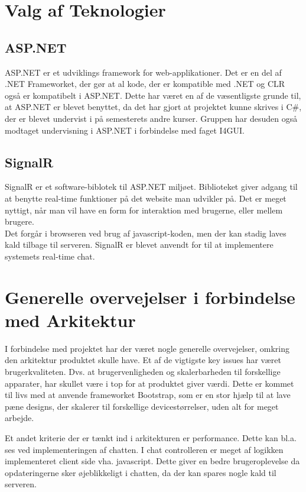 \section{Valg af Teknologier}
\subsection{ASP.NET}
ASP.NET er et udviklings framework for web-applikationer.
Det er en del af .NET Frameworket, der gør at al kode, der er  kompatible med .NET og CLR også er kompatibelt i ASP.NET. Dette har været en af de væsentligste grunde til, at ASP.NET er blevet benyttet, da det har gjort at projektet kunne skrives i C\#, der er blevet undervist i på semesterets andre kurser. Gruppen har desuden også modtaget undervisning i ASP.NET i forbindelse med faget I4GUI.

\subsection{SignalR}
SignalR er et software-biblotek til ASP.NET miljøet. Biblioteket giver adgang til at benytte real-time funktioner på det website man udvikler på. Det er meget nyttigt, når man vil have en form for interaktion med brugerne, eller mellem brugere. \\
Det forgår i browseren ved brug af javascript-koden, men der kan stadig laves kald tilbage til serveren. 
SignalR er blevet anvendt for til at implementere systemets real-time chat.

\section{Generelle overvejelser i forbindelse med Arkitektur}
I forbindelse med projektet har der været nogle generelle overvejelser, omkring den arkitektur produktet skulle have. Et af de vigtigste key issues har været brugerkvaliteten. Dvs. at brugervenligheden og skalerbarheden til forskellige apparater, har skullet være i top for at produktet giver værdi. Dette er kommet til livs med at anvende frameworket Bootstrap, som er en stor hjælp til at lave pæne designs, der skalerer til forskellige devicestørrelser,  uden alt for meget arbejde. 

Et andet kriterie der er tænkt ind i arkitekturen er performance. Dette kan bl.a. ses ved implementeringen af chatten. I chat controlleren er meget af logikken implementeret client side vha. javascript. Dette giver en bedre brugeroplevelse da opdateringerne sker øjeblikkeligt i chatten, da der kan spares nogle kald til serveren.

